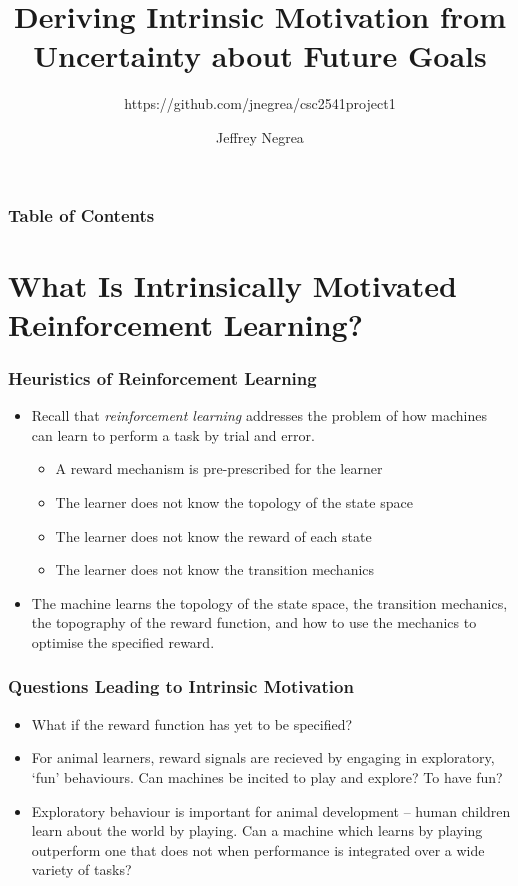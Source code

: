 \documentclass[aspectratio=169]{beamer}
\title{Deriving Intrinsic Motivation from \\ Uncertainty about Future Goals}
\subtitle{https://github.com/jnegrea/csc2541project1}
\author{
 Jeffrey Negrea
}
\institute{
 Department of Statistical Sciences\\
 University of Toronto\\
 \texttt{negrea@utstat.toronto.edu}}
\begin{document}
\frame{\titlepage}

\begin{frame}
	\frametitle{Table of Contents}
	\tableofcontents
\end{frame}

\section{What Is Intrinsically Motivated Reinforcement Learning?}
\begin{frame}
	\frametitle{Heuristics of Reinforcement Learning}
	\begin{itemize}
		\item Recall that \textit{reinforcement learning} addresses the problem of how machines can learn to perform a task by trial and error.\pause\vspace{0.5em}
		\begin{itemize}
			\item A reward mechanism is pre-prescribed for the learner 
			\item The learner does not know the topology of the state space
			\item The learner does not know the reward of each state	
			\item The learner does not know the transition mechanics\pause\vspace{0.5em}
		\end{itemize}
		\item The machine learns the topology of the state space, the transition mechanics, the topography of the reward function, and how to use the mechanics to optimise the specified reward.
	\end{itemize}
\end{frame}

\begin{frame}
	\frametitle{Questions Leading to Intrinsic Motivation}
	\begin{itemize}
		\item What if the reward function has yet to be specified?\pause\vspace{1em}
		\item For animal learners, reward signals are recieved by engaging in exploratory, `fun' behaviours. Can machines be incited to play and explore? To have fun?\pause\vspace{1em}
		\item Exploratory behaviour is important for animal development -- human children learn about the world by playing. Can a machine which learns by playing outperform one that does not when performance is integrated over a wide variety of tasks?
	\end{itemize}
\end{frame}
\end{document}
